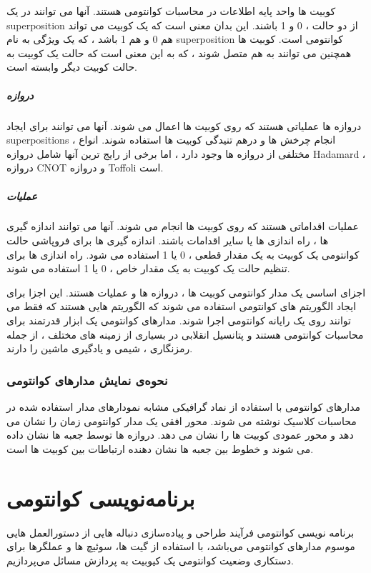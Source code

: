 \documentclass{book}
\begin{document}
کوبیت ها واحد پایه اطلاعات در محاسبات کوانتومی هستند. آنها می توانند در یک superposition از دو حالت ، 0 و 1 باشند. این بدان معنی است که یک کوبیت می تواند هم 0 و هم 1 باشد ، که یک ویژگی به نام superposition کوانتومی است. کوبیت ها همچنین می توانند به هم متصل شوند ، که به این معنی است که حالت یک کوبیت به حالت کوبیت دیگر وابسته است.
\paragraph{دروازه}
دروازه ها عملیاتی هستند که روی کوبیت ها اعمال می شوند. آنها می توانند برای ایجاد superpositions ، انجام چرخش ها و درهم تنیدگی کوبیت ها استفاده شوند. انواع مختلفی از دروازه ها وجود دارد ، اما برخی از رایج ترین آنها شامل دروازه Hadamard ، دروازه CNOT و دروازه Toffoli است.

\paragraph{عملیات}

عملیات اقداماتی هستند که روی کوبیت ها انجام می شوند. آنها می توانند اندازه گیری ها ، راه اندازی ها یا سایر اقدامات باشند. اندازه گیری ها برای فروپاشی حالت کوانتومی یک کوبیت به یک مقدار قطعی ، 0 یا 1 استفاده می شود. راه اندازی ها برای تنظیم حالت یک کوبیت به یک مقدار خاص ، 0 یا 1 استفاده می شوند.




اجزای اساسی یک مدار کوانتومی کوبیت ها ، دروازه ها و عملیات هستند. این اجزا برای ایجاد الگوریتم های کوانتومی استفاده می شوند که الگوریتم هایی هستند که فقط می توانند روی یک رایانه کوانتومی اجرا شوند. مدارهای کوانتومی یک ابزار قدرتمند برای محاسبات کوانتومی هستند و پتانسیل انقلابی در بسیاری از زمینه های مختلف ، از جمله رمزنگاری ، شیمی و یادگیری ماشین را دارند.

\subsection{نحوه‌ی نمایش مدار‌های کوانتومی}


مدارهای کوانتومی با استفاده از نماد گرافیکی مشابه نمودارهای مدار استفاده شده در محاسبات کلاسیک نوشته می شوند. محور افقی یک مدار کوانتومی زمان را نشان می دهد و محور عمودی کوبیت ها را نشان می دهد. دروازه ها توسط جعبه ها نشان داده می شوند و خطوط بین جعبه ها نشان دهنده ارتباطات بین کوبیت ها است.

\newpage
\chapter{برنامه‌نویسی کوانتومی}
برنامه نویسی کوانتومی فرآیند طراحی و پیاده‌سازی دنباله هایی از دستورالعمل هایی موسوم مدارهای کوانتومی می‌باشد، با استفاده از گیت ها، سوئیچ ها و عملگرها برای دستکاری وضعیت کوانتومی یک کیوبیت به پردازش مسائل می‌پردازیم.
\end{document}
